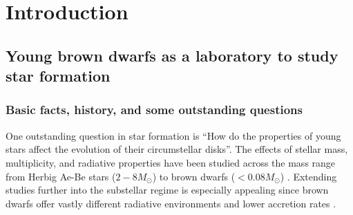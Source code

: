 \section{Introduction}



\subsection{Young brown dwarfs as a laboratory to study star formation}

\subsubsection{Basic facts, history, and some outstanding questions}
One outstanding question in star formation is ``How do the properties of young stars affect the evolution of their circumstellar disks''.  The effects of stellar mass, multiplicity, and radiative properties have been studied across the mass range from Herbig Ae-Be stars ($2-8 M_{\odot}$) to brown dwarfs ($<0.08 M_{\odot}$) \citep{2011ARA&A..49...67W}.  Extending studies further into the substellar regime is especially appealing since brown dwarfs offer vastly different radiative environments and lower accretion rates \citep{2003ApJ...592..266M,2009ApJ...696.1589H}.


